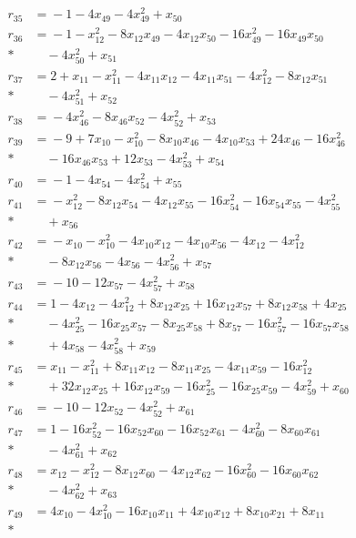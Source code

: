 \documentclass[11pt]{article}
\theoremstyle{remark}\newtheorem{remark}[theorem]{Remark}
\begin{document}
\begin{align*}
r_{35}&={}-1-4x_{49}-4x_{49}^{2}+x_{50}\\[2pt]
r_{36}&={}-1-x_{12}^{2}-8x_{12}x_{49}-4x_{12}x_{50}-16x_{49}^{2}-16x_{49}x_{50}\\*
&\quad{}-4x_{50}^{2}+x_{51}\\[2pt]
r_{37}&={}2+x_{11}-x_{11}^{2}-4x_{11}x_{12}-4x_{11}x_{51}-4x_{12}^{2}-8x_{12}x_{51}\\*
&\quad{}-4x_{51}^{2}+x_{52}\\[2pt]
r_{38}&={}-4x_{46}^{2}-8x_{46}x_{52}-4x_{52}^{2}+x_{53}\\[2pt]
r_{39}&={}-9+7x_{10}-x_{10}^{2}-8x_{10}x_{46}-4x_{10}x_{53}+24x_{46}-16x_{46}^{2}\\*
&\quad{}-16x_{46}x_{53}+12x_{53}-4x_{53}^{2}+x_{54}\\[2pt]
r_{40}&={}-1-4x_{54}-4x_{54}^{2}+x_{55}\\[2pt]
r_{41}&={}-x_{12}^{2}-8x_{12}x_{54}-4x_{12}x_{55}-16x_{54}^{2}-16x_{54}x_{55}-4x_{55}^{2}\\*
&\quad{}+x_{56}\\[2pt]
r_{42}&={}-x_{10}-x_{10}^{2}-4x_{10}x_{12}-4x_{10}x_{56}-4x_{12}-4x_{12}^{2}\\*
&\quad{}-8x_{12}x_{56}-4x_{56}-4x_{56}^{2}+x_{57}\\[2pt]
r_{43}&={}-10-12x_{57}-4x_{57}^{2}+x_{58}\\[2pt]
r_{44}&={}1-4x_{12}-4x_{12}^{2}+8x_{12}x_{25}+16x_{12}x_{57}+8x_{12}x_{58}+4x_{25}\\*
&\quad{}-4x_{25}^{2}-16x_{25}x_{57}-8x_{25}x_{58}+8x_{57}-16x_{57}^{2}-16x_{57}x_{58}\\*
&\quad{}+4x_{58}-4x_{58}^{2}+x_{59}\\[2pt]
r_{45}&={}x_{11}-x_{11}^{2}+8x_{11}x_{12}-8x_{11}x_{25}-4x_{11}x_{59}-16x_{12}^{2}\\*
&\quad{}+32x_{12}x_{25}+16x_{12}x_{59}-16x_{25}^{2}-16x_{25}x_{59}-4x_{59}^{2}+x_{60}\\[2pt]
r_{46}&={}-10-12x_{52}-4x_{52}^{2}+x_{61}\\[2pt]
r_{47}&={}1-16x_{52}^{2}-16x_{52}x_{60}-16x_{52}x_{61}-4x_{60}^{2}-8x_{60}x_{61}\\*
&\quad{}-4x_{61}^{2}+x_{62}\\[2pt]
r_{48}&={}x_{12}-x_{12}^{2}-8x_{12}x_{60}-4x_{12}x_{62}-16x_{60}^{2}-16x_{60}x_{62}\\*
&\quad{}-4x_{62}^{2}+x_{63}\\[2pt]
r_{49}&={}4x_{10}-4x_{10}^{2}-16x_{10}x_{11}+4x_{10}x_{12}+8x_{10}x_{21}+8x_{11}\\*

\end{align*}
\end{document}
